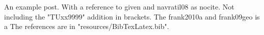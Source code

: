 \documentclass[a4paper,10pt]{scrbook}
\begin{document}
An example post.\citep{fenner2012a} With a reference
to\citep{frank09geo} given and navratil08 as nocite. Not including the
"TUxx9999" addition in brackets. The frank2010a and frank09geo is a The
references are in "resources/BibTexLatex.bib".

\printindex




\end{document}
